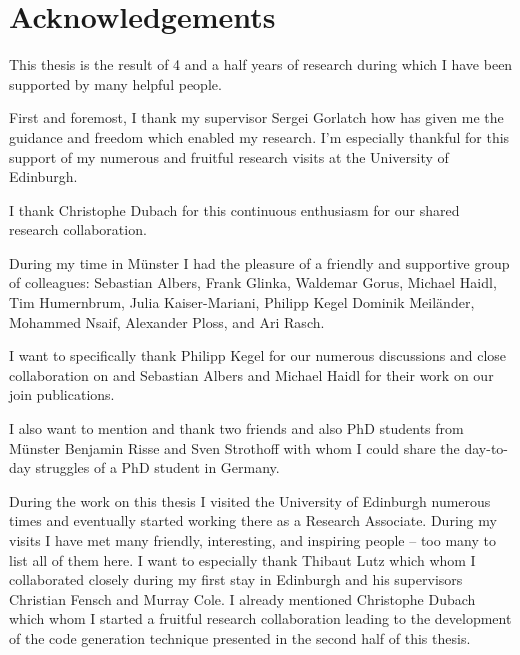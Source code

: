 

\begingroup

\let\clearpage\relax
\let\cleardoublepage\relax
\let\cleardoublepage\relax

\chapter*{Acknowledgements} %

This thesis is the result of 4 and a half years of research during which I have been supported by many helpful people.

First and foremost, I thank my supervisor Sergei Gorlatch how has given me the guidance and freedom which enabled my research.
I'm especially thankful for this support of my numerous and fruitful research visits at the University of Edinburgh.

I thank Christophe Dubach for this continuous enthusiasm for our shared research collaboration.

During my time in M{\"u}nster I had the pleasure of a friendly and supportive group of colleagues:
Sebastian Albers,
Frank Glinka,
Waldemar Gorus,
Michael Haidl,
Tim Humernbrum,
Julia Kaiser-Mariani,
Philipp Kegel
Dominik Meil{\"a}nder,
Mohammed Nsaif,
Alexander Ploss,
and
Ari Rasch.

I want to specifically thank Philipp Kegel for our numerous discussions and close collaboration on \SkelCL and Sebastian Albers and Michael Haidl for their work on our join publications.

I also want to mention and thank two friends and also PhD students from M{\"u}nster Benjamin Risse and Sven Strothoff with whom I could share the day-to-day struggles of a PhD student in Germany.

During the work on this thesis I visited the University of Edinburgh numerous times and eventually started working there as a Research Associate.
During my visits I have met many friendly, interesting, and inspiring people -- too many to list all of them here.
I want to especially thank Thibaut Lutz which whom I collaborated closely during my first stay in Edinburgh and his supervisors Christian Fensch and Murray Cole.
I already mentioned Christophe Dubach which whom I started a fruitful research collaboration leading to the development of the code generation technique presented in the second half of this thesis.

